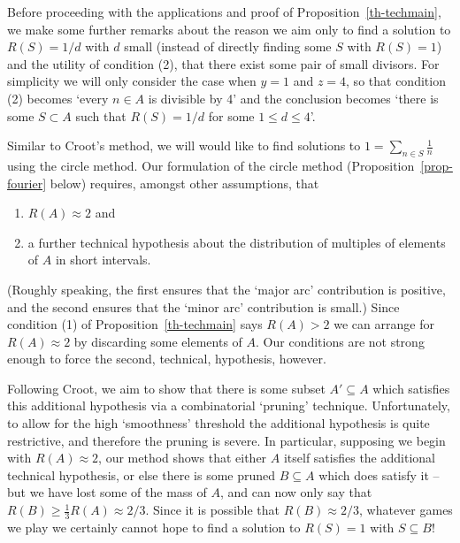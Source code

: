 \documentclass[12pt]{amsart}
\begin{document}
Before proceeding with the applications and proof of Proposition~\ref{th-techmain}, we make some further remarks about the reason we aim only to find a solution to $R(S)=1/d$ with $d$ small (instead of directly finding some $S$ with $R(S)=1$) and the utility of condition (2), that there exist some pair of small divisors. For simplicity we will only consider the case when $y=1$ and $z=4$, so that condition (2) becomes `every $n\in A$ is divisible by 4' and the conclusion becomes `there is some $S\subset A$ such that $R(S)=1/d$ for some $1\leq d\leq 4$'. 

Similar to Croot's method, we will would like to find solutions to $1=\sum_{n\in S}\frac{1}{n}$ using the circle method. Our formulation of the circle method (Proposition~\ref{prop-fourier} below) requires, amongst other assumptions, that
\begin{enumerate}
\item $R(A)\approx 2$ and
\item a further technical hypothesis about the distribution of multiples of elements of $A$ in short intervals.
\end{enumerate}
(Roughly speaking, the first ensures that the `major arc' contribution is positive, and the second ensures that the `minor arc' contribution is small.) Since condition (1) of Proposition~\ref{th-techmain} says $R(A)>2$ we can arrange for $R(A)\approx 2$ by discarding some elements of $A$. Our conditions are not strong enough to force the second, technical, hypothesis, however.

Following Croot, we aim to show that there is some subset $A'\subseteq A$ which satisfies this additional hypothesis via a combinatorial `pruning' technique. Unfortunately, to allow for the high `smoothness' threshold the additional hypothesis is quite restrictive, and therefore the pruning is severe. In particular, supposing we begin with $R(A)\approx 2$, our method shows that either $A$ itself satisfies the additional technical hypothesis, or else there is some pruned $B\subseteq A$ which does satisfy it -- but we have lost some of the mass of $A$, and can now only say that $R(B)\geq \frac{1}{3}R(A)\approx 2/3$. Since it is possible that $R(B)\approx 2/3$, whatever games we play we certainly cannot hope to find a solution to $R(S)=1$ with $S\subseteq B$! 
\end{document}
